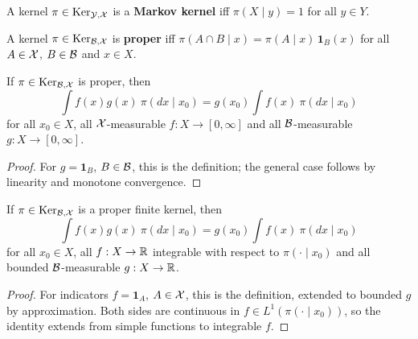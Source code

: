 \begin{definition}
    \label{def:markov-ker}
    \leanok{}

    A kernel $\pi\in\text{Ker}_{\mathcal{Y},\mathcal{X}}$ is a \textbf{Markov kernel} iff $\pi(X\mid y)=1$
    for all $y \in Y$.
\end{definition}

\begin{definition}
    \label{def:proper-ker}
    \leanok{}

    A kernel $\pi\in\text{Ker}_{\mathcal{B},\mathcal{X}}$ is \textbf{proper} iff
    $\pi(A\cap B\mid x)=\pi(A\mid x)\,\mathbf{1}_B(x)$ for all $A\in\mathcal{X}$, $B\in\mathcal{B}$ and $x\in X$.
\end{definition}

\begin{lemma}
    \label{lem:proper-ker-lintegral}
    \leanok{}

    If $\pi\in\text{Ker}_{\mathcal{B},\mathcal{X}}$ is proper, then
    \[\int f(x) g(x)\ \pi(dx\mid x_0) = g(x_0)\int f(x)\ \pi(dx\mid x_0)\]
    for all $x_0 \in X$, all $\mathcal{X}$-measurable $f : X \to [0, \infty]$ and all $\mathcal{B}$-measurable
    $g : X \to [0,\infty]$.
\end{lemma}
\begin{proof}
    \leanok{}

    For $g = \mathbf 1_B$, $B \in \mathcal{B}$, this is the definition; the general case follows by
    linearity and monotone convergence.
\end{proof}

\begin{lemma}
    \label{lem:proper-ker-integral}
    \leanok{}

    If $\pi\in\text{Ker}_{\mathcal{B},\mathcal{X}}$ is a proper finite kernel, then
    \[\int f(x) g(x)\ \pi(dx\mid x_0) = g(x_0)\int f(x)\ \pi(dx\mid x_0)\]
    for all $x_0 \in X$, all $f : X \to \mathbb{R}$ integrable with respect to $\pi(\cdot\mid x_0)$ and
    all bounded $\mathcal{B}$-measurable $g : X \to \mathbb{R}$.
\end{lemma}
\begin{proof}
    \leanok

    For indicators $f = \mathbf 1_A$, $A \in \mathcal{X}$, this is the definition, extended to bounded
    $g$ by approximation. Both sides are continuous in $f \in L^1(\pi(\cdot\mid x_0))$, so the
    identity extends from simple functions to integrable $f$.
\end{proof}

